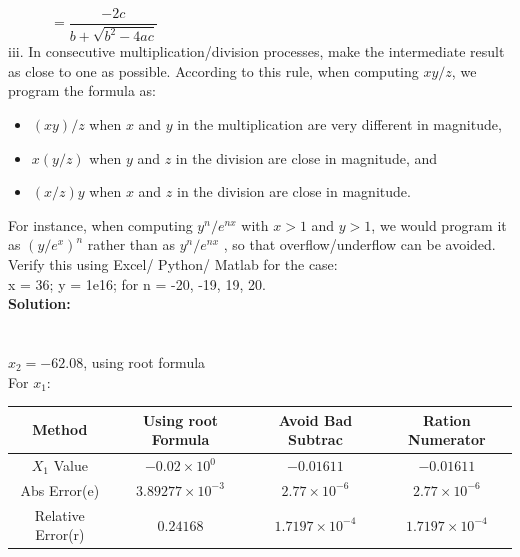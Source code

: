 \documentclass[a4paper,12pt]{article}
\begin{document}
\newpage
$ \quad \qquad = \dfrac{-2c}{b+\sqrt{b^2-4ac}}$\\[0.3cm]
iii. In consecutive multiplication/division processes, make the intermediate result as close to one as possible. According to this rule, when computing $xy/z$, we program the formula as:
\begin{itemize}
\item $(xy)/z$ when $x$ and $y$ in the multiplication are very different in magnitude,
\item $x(y/z)$ when $y$ and $z$ in the division are close in magnitude, and 
\item $(x/z)y$ when $x$ and $z$ in the division are close in magnitude.
\end{itemize} 
For instance, when computing $y^n/e^{nx}$ with $x>1$ and $y>1$, we would program it as $(y/e^x)^n$ rather than as $y^n/ e^{nx}$ , so that overflow/underflow can be avoided. Verify this using Excel/ Python/ Matlab for the case:\\
x = 36; y = 1e16; for n = {-20, -19, 19, 20}.\\[0.5cm]
{\color{blue}\textbf{Solution: \\}}
 \\
 \indent {}\\
 \indent\quad $x_2 =-62.08$, using root formula\\
 \indent\quad For $x_1$:\\[0.3cm]
 \begin{tabular}{|c|c|c|c|}
 \hline 
 Method & Using root Formula & Avoid Bad Subtrac & Ration Numerator \\ 
 \hline
 $X_1$ Value & $-0.02\times 10^0$ & $-0.01611$ & $-0.01611$ \\
 \hline 
 Abs Error(e)& $3.89277\times 10^{-3}$ & $2.77\times 10^{-6}$ & $2.77\times 10^{-6}$ \\ 
 \hline 
 Relative Error(r) & $0.24168$ & $1.7197\times 10^{-4}$ & $1.7197\times 10^{-4}$ \\ 
 \hline 
 \end{tabular}\\[0.3cm]
 
\end{document}
